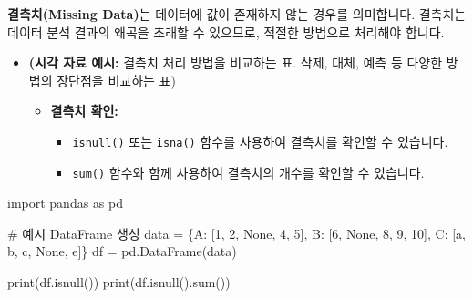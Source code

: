 \documentclass[
  letterpaper,
]{book}
\newenvironment{Shaded}{\begin{snugshade}}{\end{snugshade}}
\newcommand{\BuiltInTok}[1]{\textcolor[rgb]{0.00,0.23,0.31}{#1}}
\newcommand{\CommentTok}[1]{\textcolor[rgb]{0.37,0.37,0.37}{#1}}
\newcommand{\DecValTok}[1]{\textcolor[rgb]{0.68,0.00,0.00}{#1}}
\newcommand{\ImportTok}[1]{\textcolor[rgb]{0.00,0.46,0.62}{#1}}
\newcommand{\NormalTok}[1]{\textcolor[rgb]{0.00,0.23,0.31}{#1}}
\newcommand{\OperatorTok}[1]{\textcolor[rgb]{0.37,0.37,0.37}{#1}}
\newcommand{\StringTok}[1]{\textcolor[rgb]{0.13,0.47,0.30}{#1}}
\newcommand{\VariableTok}[1]{\textcolor[rgb]{0.07,0.07,0.07}{#1}}
\providecommand{\tightlist}{%
  \setlength{\itemsep}{0pt}\setlength{\parskip}{0pt}}
\begin{document}
\textbf{결측치(Missing Data)}는 데이터에 값이 존재하지 않는 경우를
의미합니다. 결측치는 데이터 분석 결과의 왜곡을 초래할 수 있으므로,
적절한 방법으로 처리해야 합니다.

\begin{itemize}
\item
  \textbf{(시각 자료 예시:} 결측치 처리 방법을 비교하는 표. 삭제, 대체,
  예측 등 다양한 방법의 장단점을 비교하는 표)

  \begin{itemize}
  \tightlist
  \item
    \textbf{결측치 확인:}

    \begin{itemize}
    \tightlist
    \item
      \texttt{isnull()} 또는 \texttt{isna()} 함수를 사용하여 결측치를
      확인할 수 있습니다.
    \item
      \texttt{sum()} 함수와 함께 사용하여 결측치의 개수를 확인할 수
      있습니다.
    \end{itemize}
  \end{itemize}
\end{itemize}

\begin{Shaded}
\begin{Highlighting}[]
    \ImportTok{import}\NormalTok{ pandas }\ImportTok{as}\NormalTok{ pd}

    \CommentTok{\# 예시 DataFrame 생성}
\NormalTok{    data }\OperatorTok{=}\NormalTok{ \{}\StringTok{\textquotesingle{}A\textquotesingle{}}\NormalTok{: [}\DecValTok{1}\NormalTok{, }\DecValTok{2}\NormalTok{, }\VariableTok{None}\NormalTok{, }\DecValTok{4}\NormalTok{, }\DecValTok{5}\NormalTok{], }\StringTok{\textquotesingle{}B\textquotesingle{}}\NormalTok{: [}\DecValTok{6}\NormalTok{, }\VariableTok{None}\NormalTok{, }\DecValTok{8}\NormalTok{, }\DecValTok{9}\NormalTok{, }\DecValTok{10}\NormalTok{], }\StringTok{\textquotesingle{}C\textquotesingle{}}\NormalTok{: [}\StringTok{\textquotesingle{}a\textquotesingle{}}\NormalTok{, }\StringTok{\textquotesingle{}b\textquotesingle{}}\NormalTok{, }\StringTok{\textquotesingle{}c\textquotesingle{}}\NormalTok{, }\VariableTok{None}\NormalTok{, }\StringTok{\textquotesingle{}e\textquotesingle{}}\NormalTok{]\}}
\NormalTok{    df }\OperatorTok{=}\NormalTok{ pd.DataFrame(data)}

    \BuiltInTok{print}\NormalTok{(df.isnull())}
    \BuiltInTok{print}\NormalTok{(df.isnull().}\BuiltInTok{sum}\NormalTok{())}
\end{Highlighting}
\end{Shaded}
\end{document}
